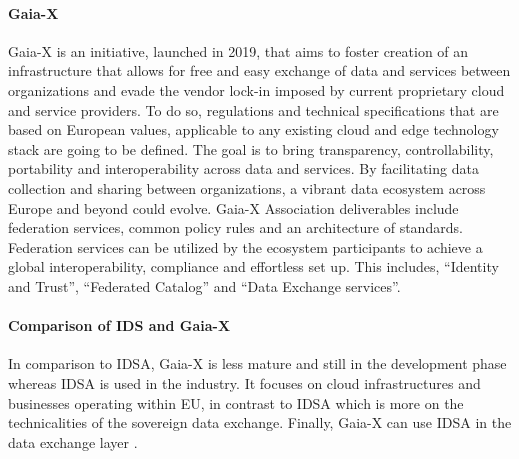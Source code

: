 \documentclass{article}
\begin{document}
\paragraph{Gaia-X}

Gaia-X is an initiative, launched in 2019, that aims to foster creation of an infrastructure that allows for free and easy exchange of data and services between organizations and evade the vendor lock-in imposed by current proprietary cloud and service providers. To do so, regulations and technical specifications that are based on European values, applicable to any existing cloud and edge technology stack are going to be defined. The goal is to bring transparency, controllability, portability and interoperability across data and services. By facilitating data collection and sharing between organizations, a vibrant data ecosystem across Europe and beyond could evolve. Gaia-X Association deliverables include federation services, common policy rules and an architecture of standards. Federation services can be utilized by the ecosystem participants to achieve a global interoperability, compliance and effortless set up. This includes, “Identity and Trust”, “Federated Catalog” and “Data Exchange services”. \cite{otto_role_2022}

\paragraph{Comparison of IDS and Gaia-X}




In comparison to IDSA, Gaia-X is less mature and still in the development phase whereas IDSA is used in the industry. It focuses on cloud infrastructures and businesses operating within EU, in contrast to IDSA which is more on the technicalities of the sovereign data exchange. Finally, Gaia-X can use IDSA in the data exchange layer \cite{otto_prof_dr_boris_gaia-x_2021}. 
\end{document}

